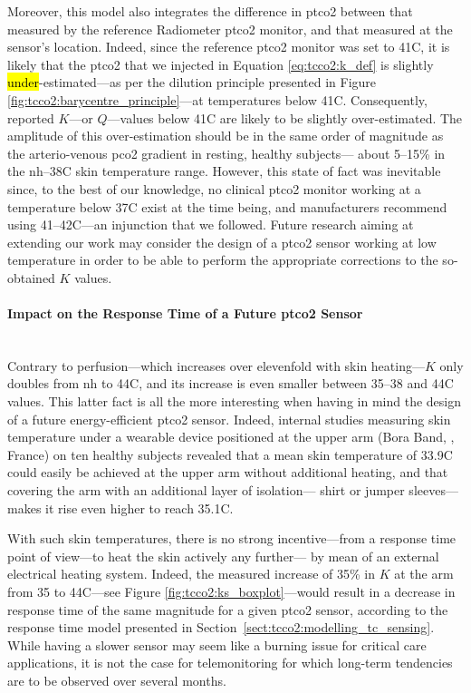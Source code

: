 Moreover, this model also integrates the difference in \gls{ptco2} between that measured by the reference Radiometer \gls{ptco2} monitor, and that measured at the sensor's location. Indeed, since the reference \gls{ptco2} monitor was set to 41{\degree}C, it is likely that the \gls{ptco2} that we injected in Equation \ref{eq:tcco2:k_def} is slightly \hl{under}-estimated---as per the dilution principle presented in Figure \ref{fig:tcco2:barycentre_principle}---at temperatures below 41{\degree}C. Consequently, reported $K$---or $Q$---values below 41{\degree}C are likely to be slightly over-estimated. The amplitude of this over-estimation should be in the same order of magnitude as the arterio-venous \gls{pco2} gradient in resting, healthy subjects---\ie{} about 5--15\% in the \gls{nh}--38{\degree}C skin temperature range\cite{kowalchuk1988, schneider2013}. \mfrin{}However, this state of fact was inevitable since, to the best of our knowledge, no clinical \gls{ptco2} monitor working at a temperature below 37{\degree}C exist at the time being, and manufacturers recommend using 41--42{\degree}C---an injunction that we followed. Future research aiming at extending our work may consider the design of a \gls{ptco2} sensor working at low temperature in order to be able to perform the appropriate corrections to the so-obtained $K$ values.

\paragraph{Impact on the Response Time of a Future \texorpdfstring{\gls{ptco2}}{tcpCO2} Sensor}\label{subsect:tcco2:future_rt}\mbox{}\\

Contrary to perfusion---which increases over elevenfold with skin heating---$K$ only doubles from \gls{nh} to 44{\degree}C, and its increase is even smaller between 35--38 and 44{\degree}C values. This latter fact is all the more interesting when having in mind the design of a future energy-efficient \gls{ptco2} sensor. Indeed, internal studies measuring skin temperature under a wearable device positioned at the upper arm (Bora Band, \bscy{}, France) on ten healthy subjects revealed that a mean skin temperature of 33.9{\degree}C could easily be achieved at the upper arm without additional heating, and that covering the arm with an additional layer of isolation---\ie{} shirt or jumper sleeves---makes it rise even higher to reach 35.1{\degree}C.

With such skin temperatures, there is no strong incentive---from a response time point of view---to heat the skin actively any further---\ie{} by mean of an external electrical heating system. Indeed, the measured increase of 35\% in $K$ at the arm from 35 to 44{\degree}C---see Figure \ref{fig:tcco2:ks_boxplot}---would result in a decrease in response time of the same magnitude for a given \gls{ptco2} sensor, according to the response time model presented in Section~\ref{sect:tcco2:modelling_tc_sensing}. While having a slower sensor may seem like a burning issue for critical care applications, it is not the case for telemonitoring for which long-term tendencies are to be observed over several months\cite{jang2021}.

